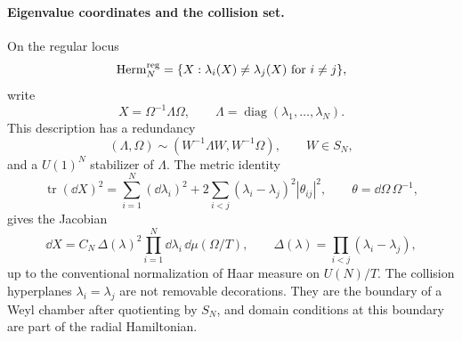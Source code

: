 \paragraph{Eigenvalue coordinates and the collision set.}
On the regular locus
\[
  \operatorname{Herm}_N^{\rm reg}
  =
  \{X:\lambda_i(X)\ne\lambda_j(X)\ \text{for}\ i\ne j\},
\]
write
\[
  X=\Omega^{-1}\Lambda\Omega,\qquad
  \Lambda=\operatorname{diag}(\lambda_1,\ldots,\lambda_N).
\]
This description has a redundancy
\[
  (\Lambda,\Omega)
  \sim
  (W^{-1}\Lambda W,W^{-1}\Omega),
  \qquad W\in S_N,
\]
and a \(U(1)^N\) stabilizer of \(\Lambda\).  The metric identity
\begin{equation}
  \operatorname{tr}(\dd X)^2
  =
  \sum_{i=1}^N(\dd\lambda_i)^2
  +
  2\sum_{i<j}
  (\lambda_i-\lambda_j)^2
  |\theta_{ij}|^2,
  \qquad
  \theta=\dd\Omega\,\Omega^{-1},
  \label{eq:matrix-qm-eigenvalue-metric}
\end{equation}
gives the Jacobian
\begin{equation}
  \dd X
  =
  C_N\,\Delta(\lambda)^2
  \prod_{i=1}^N\dd\lambda_i\,\dd\mu(\Omega/T),
  \qquad
  \Delta(\lambda)=\prod_{i<j}(\lambda_i-\lambda_j),
  \label{eq:matrix-qm-vandermonde-measure}
\end{equation}
up to the conventional normalization of Haar measure on \(U(N)/T\).
The collision hyperplanes \(\lambda_i=\lambda_j\) are not removable
decorations.  They are the boundary of a Weyl chamber after quotienting by
\(S_N\), and domain conditions at this boundary are part of the radial
Hamiltonian.


